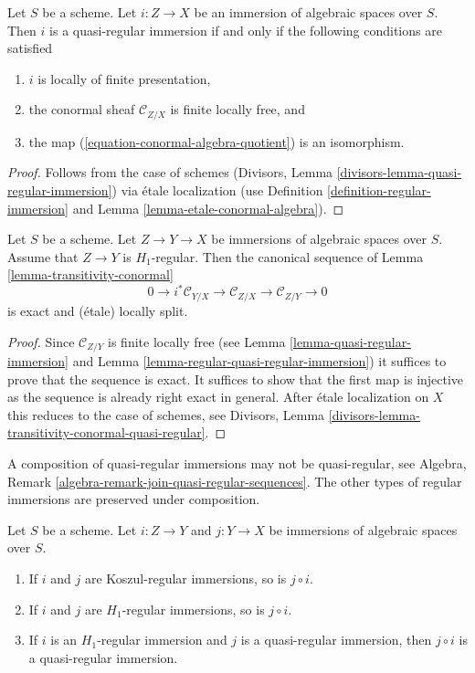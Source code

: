 \begin{lemma}
\label{lemma-quasi-regular-immersion}
Let $S$ be a scheme. Let $i : Z \to X$ be an immersion of algebraic spaces
over $S$. Then $i$ is a quasi-regular immersion if and only if the following
conditions are satisfied
\begin{enumerate}
\item $i$ is locally of finite presentation,
\item the conormal sheaf $\mathcal{C}_{Z/X}$ is finite locally free, and
\item the map (\ref{equation-conormal-algebra-quotient}) is an isomorphism.
\end{enumerate}
\end{lemma}

\begin{proof}
Follows from the case of schemes
(Divisors, Lemma \ref{divisors-lemma-quasi-regular-immersion})
via \'etale localization (use Definition \ref{definition-regular-immersion}
and
Lemma \ref{lemma-etale-conormal-algebra}).
\end{proof}

\begin{lemma}
\label{lemma-transitivity-conormal-quasi-regular}
Let $S$ be a scheme. Let $Z \to Y \to X$ be immersions of algebraic spaces
over $S$. Assume that $Z \to Y$ is $H_1$-regular. Then the canonical
sequence of Lemma \ref{lemma-transitivity-conormal}
$$
0 \to i^*\mathcal{C}_{Y/X} \to
\mathcal{C}_{Z/X} \to
\mathcal{C}_{Z/Y} \to 0
$$
is exact and (\'etale) locally split.
\end{lemma}

\begin{proof}
Since $\mathcal{C}_{Z/Y}$ is finite locally free (see
Lemma \ref{lemma-quasi-regular-immersion}
and
Lemma \ref{lemma-regular-quasi-regular-immersion})
it suffices to prove that the sequence is exact.
It suffices to show that the first map is injective
as the sequence is already right exact in general.
After \'etale localization on $X$ this reduces to the case
of schemes, see
Divisors, Lemma \ref{divisors-lemma-transitivity-conormal-quasi-regular}.
\end{proof}

\noindent
A composition of quasi-regular immersions may not be quasi-regular, see
Algebra, Remark \ref{algebra-remark-join-quasi-regular-sequences}.
The other types of regular immersions are preserved under composition.

\begin{lemma}
\label{lemma-composition-regular-immersion}
Let $S$ be a scheme. Let $i : Z \to Y$ and $j : Y \to X$ be immersions of
algebraic spaces over $S$.
\begin{enumerate}
\item If $i$ and $j$ are Koszul-regular immersions, so is $j \circ i$.
\item If $i$ and $j$ are $H_1$-regular immersions, so is $j \circ i$.
\item If $i$ is an $H_1$-regular immersion and $j$ is a quasi-regular
immersion, then $j \circ i$ is a quasi-regular immersion.
\end{enumerate}
\end{lemma}

